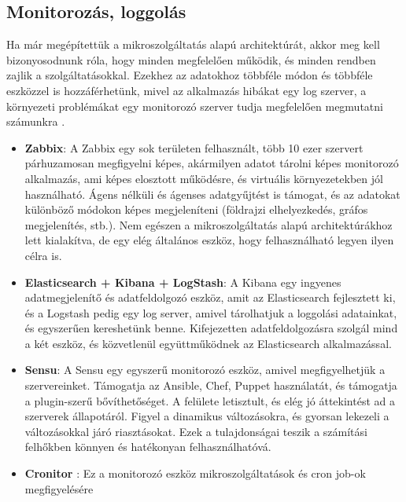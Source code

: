 \documentclass[11pt,magyar,a4paper,twoside,]{report}
\begin{document}
\subsection{Monitorozás, loggolás}\label{monitorozuxe1s-loggoluxe1s}

Ha már megépítettük a mikroszolgáltatás alapú architektúrát, akkor meg
kell bizonyosodnunk róla, hogy minden megfelelően működik, és minden
rendben zajlik a szolgáltatásokkal. Ezekhez az adatokhoz többféle módon
és többféle eszközzel is hozzáférhetünk, mivel az alkalmazás hibákat egy
log szerver, a környezeti problémákat egy monitorozó szerver tudja
megfelelően megmutatni számunkra\citep{micro-service-monitoring}
\citep{microservice-monitoring}.

\begin{itemize}
\item
  \textbf{Zabbix}\citep{zabbix}: A Zabbix egy sok területen felhasznált,
  több 10 ezer szervert párhuzamosan megfigyelni képes, akármilyen
  adatot tárolni képes monitorozó alkalmazás, ami képes elosztott
  működésre, és virtuális környezetekben jól használható. Ágens nélküli
  és ágenses adatgyűjtést is támogat, és az adatokat különböző módokon
  képes megjeleníteni (földrajzi elhelyezkedés, gráfos megjelenítés,
  stb.). Nem egészen a mikroszolgáltatás alapú architektúrákhoz lett
  kialakítva, de egy elég általános eszköz, hogy felhasználható legyen
  ilyen célra is.
\item
  \textbf{Elasticsearch + Kibana\citep{kibana} +
  LogStash}\citep{logstash}: A Kibana egy ingyenes adatmegjelenítő és
  adatfeldolgozó eszköz, amit az Elasticsearch fejlesztett ki, és a
  Logstash pedig egy log server, amivel tárolhatjuk a loggolási
  adatainkat, és egyszerűen kereshetünk benne. Kifejezetten
  adatfeldolgozásra szolgál mind a két eszköz, és közvetlenül
  együttműködnek az Elasticsearch alkalmazással.
\item
  \textbf{Sensu}\citep{sensu}: A Sensu egy egyszerű monitorozó eszköz,
  amivel megfigyelhetjük a szervereinket. Támogatja az Ansible, Chef,
  Puppet használatát, és támogatja a plugin-szerű bővíthetőséget. A
  felülete letisztult, és elég jó áttekintést ad a szerverek
  állapotáról. Figyel a dinamikus változásokra, és gyorsan lekezeli a
  változásokkal járó riasztásokat. Ezek a tulajdonságai teszik a
  számítási felhőkben könnyen és hatékonyan felhasználhatóvá.
\item
  \textbf{Cronitor}\citep{cronitor} \citep{cron-monitoring}: Ez a
  monitorozó eszköz mikroszolgáltatások és cron job-ok megfigyelésére

\end{itemize}
\end{document}
